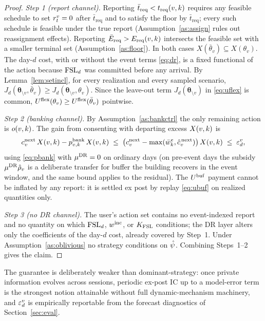 \begin{proof}
\emph{Step 1 (report channel).} Reporting
$\bar{t}_{\mathrm{req}} < t_{\mathrm{req}}(v,k)$ requires any feasible schedule to set
$r_{t}^{v} = 0$ after $\bar{t}_{\mathrm{req}}$ and to satisfy the
floor by $\bar{t}_{\mathrm{req}}$; every such schedule is feasible
under the true report (Assumption~\ref{as:assign} rules out
reassignment effects). Reporting $\bar{E}_{\mathrm{req}} > E_{\mathrm{req}}(v,k)$
intersects the feasible set with a smaller terminal set
(Assumption~\ref{as:floor}). In both cases
$X(\bar\theta_v) \subseteq X(\theta_v)$. The day-$d$ cost, with or
without the event terms \eqref{eq:dr}, is a fixed functional of the
action because $\mathrm{FSL}_d$ was committed before any arrival. By
Lemma~\ref{lem:setincl}, for every realization and every sampled
scenario,
$J_d(\bm{\theta}_{\setminus v}, \bar\theta_v) \ge
 J_d(\bm{\theta}_{\setminus v}, \theta_v)$.
Since the leave-out term
$J_d(\bm{\theta}_{\setminus v})$ in \eqref{eq:uflex} is common,
$U^{\mathrm{flex}}(\theta_v) \ge U^{\mathrm{flex}}(\bar\theta_v)$ pointwise.

\emph{Step 2 (banking channel).} By
Assumption~\ref{as:bankctrl} the only remaining action is
$o(v,k)$. The gain from consenting with departing excess
$X(v,k)$ is
\[
c^{\mathrm{next}}_{v}\,X(v,k) - p^{\mathrm{bank}}_{v,k}\,X(v,k)
\;\le\; \bigl(c^{\mathrm{next}}_{v} - \max(\bar{w}^{e}_{k},
\hat{c}^{\,\mathrm{next}}_{v})\bigr)\,X(v,k)
\;\le\; \varepsilon^{v}_{d},
\]
using \eqref{eq:pbank} with $\mu^{\mathrm{DR}} = 0$ on ordinary days (on
pre-event days the subsidy $\mu^{\mathrm{DR}}\hat{\rho}_v$ is a deliberate transfer
for buffer the building recovers in the event window, and the same
bound applies to the residual). The $U^{\mathrm{buf}}$ payment cannot be inflated
by any report: it is settled ex post by replay \eqref{eq:ubuf} on
realized quantities only.

\emph{Step 3 (no DR channel).} The user's action set contains no
event-indexed report and no quantity on which $\mathrm{FSL}_d$, $w^{\mathrm{inc}}$, or
$K_{\mathrm{FSL}}$ conditions; the DR layer alters only the coefficients of the
day-$d$ cost, already covered by Step~1. Under
Assumption~\ref{as:oblivious} no strategy conditions on $\hat{\psi}$.
Combining Steps~1--2 gives the claim.
\end{proof}

\begin{remark}
The guarantee is deliberately weaker than dominant-strategy: once
private information evolves across sessions, periodic ex-post IC up to
a model-error term is the strongest notion attainable without full
dynamic-mechanism machinery, and $\varepsilon^{v}_{d}$ is empirically
reportable from the forecast diagnostics of Section~\ref{sec:eval}.
\end{remark}

